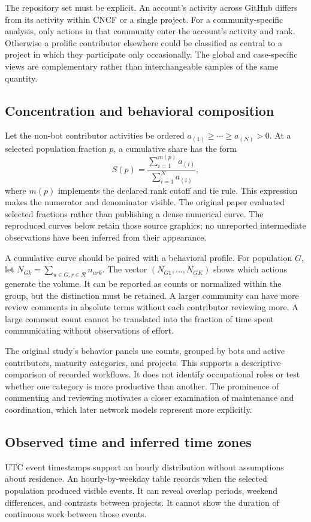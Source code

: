 The repository set must be explicit. An account's activity across GitHub differs from its activity within CNCF or a single project. For a community-specific analysis, only actions in that community enter the account's activity and rank. Otherwise a prolific contributor elsewhere could be classified as central to a project in which they participate only occasionally. The global and case-specific views are complementary rather than interchangeable samples of the same quantity.

\subsection{Concentration and behavioral composition}
Let the non-bot contributor activities be ordered \(a_{(1)}\geq\cdots\geq a_{(N)}>0\). At a selected population fraction \(p\), a cumulative share has the form
\begin{equation}
S(p)=\frac{\sum_{i=1}^{m(p)}a_{(i)}}{\sum_{i=1}^{N}a_{(i)}},
\label{eq:ch4-concentration}
\end{equation}
where \(m(p)\) implements the declared rank cutoff and tie rule. This expression makes the numerator and denominator visible. The original paper evaluated selected fractions rather than publishing a dense numerical curve. The reproduced curves below retain those source graphics; no unreported intermediate observations have been inferred from their appearance.

A cumulative curve should be paired with a behavioral profile. For population \(G\), let \(N_{Gk}=\sum_{u\in G,r\in\mathcal R}n_{urk}\). The vector \((N_{G1},\ldots,N_{GK})\) shows which actions generate the volume. It can be reported as counts or normalized within the group, but the distinction must be retained. A larger community can have more review comments in absolute terms without each contributor reviewing more. A large comment count cannot be translated into the fraction of time spent communicating without observations of effort.

The original study's behavior panels use counts, grouped by bots and active contributors, maturity categories, and projects. This supports a descriptive comparison of recorded workflows. It does not identify occupational roles or test whether one category is more productive than another. The prominence of commenting and reviewing motivates a closer examination of maintenance and coordination, which later network models represent more explicitly.

\subsection{Observed time and inferred time zones}
UTC event timestamps support an hourly distribution without assumptions about residence. An hourly-by-weekday table records when the selected population produced visible events. It can reveal overlap periods, weekend differences, and contrasts between projects. It cannot show the duration of continuous work between those events.

